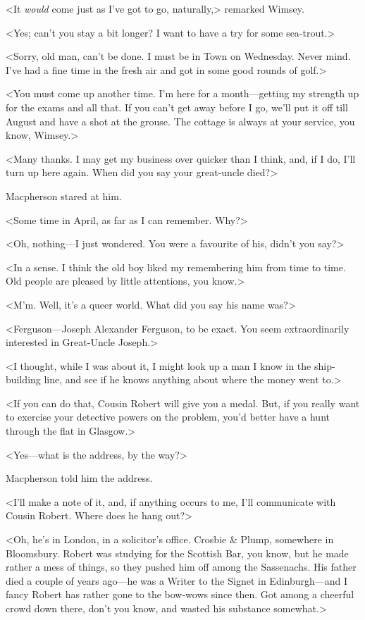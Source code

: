 <It \textit{would} come just as I've got to go, naturally,> remarked Wimsey.

<Yes; can't you stay a bit longer? I want to have a try for some sea-trout.>

<Sorry, old man, can't be done. I must be in Town on Wednesday. Never mind. I've had a fine time in the fresh air and got in some good rounds of golf.>

<You must come up another time. I'm here for a month—getting my strength up for the exams and all that. If you can't get away before I go, we'll put it off till August and have a shot at the grouse. The cottage is always at your service, you know, Wimsey.>

<Many thanks. I may get my business over quicker than I think, and, if I do, I'll turn up here again. When did you say your great-uncle died?>

Macpherson stared at him.

<Some time in April, as far as I can remember. Why?>

<Oh, nothing—I just wondered. You were a favourite of his, didn't you say?>

<In a sense. I think the old boy liked my remembering him from time to time. Old people are pleased by little attentions, you know.>

<M'm. Well, it's a queer world. What did you say his name was?>

<Ferguson—Joseph Alexander Ferguson, to be exact. You seem extraordinarily interested in Great-Uncle Joseph.>

<I thought, while I was about it, I might look up a man I know in the ship-building line, and see if he knows anything about where the money went to.>

<If you can do that, Cousin Robert will give you a medal. But, if you really want to exercise your detective powers on the problem, you'd better have a hunt through the flat in Glasgow.>

<Yes—what is the address, by the way?>

Macpherson told him the address.

<I'll make a note of it, and, if anything occurs to me, I'll communicate with Cousin Robert. Where does he hang out?>

<Oh, he's in London, in a solicitor's office. Crosbie \& Plump, somewhere in Bloomsbury. Robert was studying for the Scottish Bar, you know, but he made rather a mess of things, so they pushed him off among the Sassenachs. His father died a couple of years ago—he was a Writer to the Signet in Edinburgh—and I fancy Robert has rather gone to the bow-wows since then. Got among a cheerful crowd down there, don't you know, and wasted his substance somewhat.>

